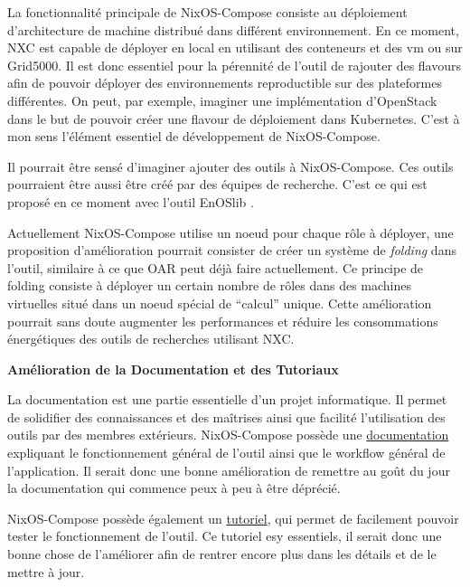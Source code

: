 \documentclass[a4paper,french,12pt, titlepage]{article}
\begin{document}
La fonctionnalité principale de NixOS-Compose consiste au déploiement
d'architecture de machine distribué dans différent environnement. En ce
moment, NXC est capable de déployer en local en utilisant des conteneurs
et des vm ou sur Grid5000. Il est donc essentiel pour la pérennité de
l'outil de rajouter des flavours afin de pouvoir déployer des
environnements reproductible sur des plateformes différentes. On peut,
par exemple, imaginer une implémentation d'OpenStack dans le but de
pouvoir créer une flavour de déploiement dans Kubernetes. C'est à mon
sens l'élément essentiel de développement de NixOS-Compose.\newline

Il pourrait être sensé d'imaginer ajouter des outils à NixOS-Compose.
Ces outils pourraient être aussi être créé par des équipes de recherche.
C'est ce qui est proposé en ce moment avec l'outil EnOSlib
\cite{enoslib2021}.\newline

Actuellement NixOS-Compose utilise un noeud pour chaque rôle à déployer,
une proposition d'amélioration pourrait consister de créer un système de
\emph{folding} \cite{folding2015} dans l'outil, similaire à ce que OAR
peut déjà faire actuellement. Ce principe de folding consiste à déployer
un certain nombre de rôles dans des machines virtuelles situé dans un
noeud spécial de ``calcul'' unique. Cette amélioration pourrait sans
doute augmenter les performances et réduire les consommations
énergétiques des outils de recherches utilisant NXC.\newline

\textbf{Amélioration de la Documentation et des Tutoriaux}\newline

La documentation est une partie essentielle d'un projet informatique. Il
permet de solidifier des connaissances et des maîtrises ainsi que
facilité l'utilisation des outils par des membres extérieurs.
NixOS-Compose possède une
\href{https://nixos-compose.gitlabpages.inria.fr/nixos-compose/}{documentation}
expliquant le fonctionnement général de l'outil ainsi que le workflow
général de l'application. Il serait donc une bonne amélioration de
remettre au goût du jour la documentation qui commence peux à peu à être
déprécié.\newline

NixOS-Compose possède également un
\href{https://gitlab.inria.fr/nixos-compose/tuto-nxc}{tutoriel}, qui
permet de facilement pouvoir tester le fonctionnement de l'outil. Ce
tutoriel esy essentiels, il serait donc une bonne chose de l'améliorer
afin de rentrer encore plus dans les détails et de le mettre à
jour.\newline
\end{document}

